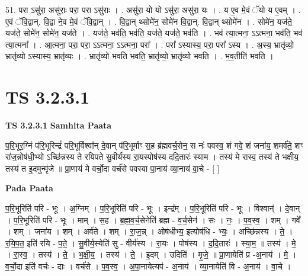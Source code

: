 \documentclass[17pt]{extarticle}
\begin{document}
51. परा ऽसु॑रा॒ असु॑राः॒ परा॒ परा ऽसु॑राः । . असु॑रा॒ यो यो ऽसु॑रा॒ असु॑रा॒ यः । . य ए॒व मे॒वं ॅयो य ए॒वम् । . ए॒वं ॅवि॒द्वान्. वि॒द्वा ने॒व मे॒वं ॅवि॒द्वान् । . वि॒द्वान् थ्सोमे॑न॒ सोमे॑न वि॒द्वान्. वि॒द्वान् थ्सोमे॑न । . सोमे॑न॒ यज॑ते॒ यज॑ते॒ सोमे॑न॒ सोमे॑न॒ यज॑ते । . यज॑ते॒ भव॑ति॒ भव॑ति॒ यज॑ते॒ यज॑ते॒ भव॑ति । . भव॑ त्या॒त्मना॒ ऽऽत्मना॒ भव॑ति॒ भव॑ त्या॒त्मना᳚ । . आ॒त्मना॒ परा॒ परा॒ ऽऽत्मना॒ ऽऽत्मना॒ परा᳚ । . परा᳚ ऽस्यास्य॒ परा॒ परा᳚ ऽस्य । . अ॒स्य॒ भ्रातृ॑व्यो॒ भ्रातृ॑व्यो ऽस्यास्य॒ भ्रातृ॑व्यः । . भ्रातृ॑व्यो भवति भवति॒ भ्रातृ॑व्यो॒ भ्रातृ॑व्यो भवति । . भ॒व॒तीति॑ भवति । \newline


\section{ TS 3.2.3.1 }

\textbf{TS 3.2.3.1 } \newline
\textbf{Samhita Paata} \newline

प॒रि॒भूर॒ग्निं प॑रि॒भूरिन्द्रं॑ परि॒भूर्विश्वा᳚न् दे॒वान् प॑रि॒भूर्माꣳ स॒ह ब्र॑ह्मवर्च॒सेन॒ स नः॑ पवस्व॒ शं गवे॒ शं जना॑य॒ शमर्व॑ते॒ शꣳ रा॑ज॒न्नोष॑धी॒भ्यो ऽच्छि॑न्नस्य ते रयिपते सु॒वीर्य॑स्य रा॒यस्पोष॑स्य ददि॒तारः॑ स्याम । तस्य॑ मे रास्व॒ तस्य॑ ते भक्षीय॒ तस्य॑ त इ॒दमुन्मृ॑जे ॥ प्रा॒णाय॑ मे वर्चो॒दा वर्च॑से पवस्वा पा॒नाय॑ व्या॒नाय॑ वा॒चे - [  ] \newline

\textbf{Pada Paata} \newline

प॒रि॒भूरिति॑ परि - भूः । अ॒ग्निम् । प॒रि॒भूरिति॑ परि - भूः । इन्द्र᳚म् । प॒रि॒भूरिति॑ परि - भूः । विश्वान्॑ । दे॒वान् । प॒रि॒भूरिति॑ परि - भूः । माम् । स॒ह । ब्र॒ह्म॒व॒र्च॒सेनेति॑ ब्रह्म - व॒र्च॒सेन॑ । सः । नः॒ । प॒व॒स्व॒ । शम् । गवे᳚ । शम् । जना॑य । शम् । अर्व॑ते । शम् । रा॒ज॒न्न् । ओष॑धीभ्य॒ इत्योष॑धि - भ्यः॒ । अच्छि॑न्नस्य । ते॒ । र॒यि॒प॒त॒ इति॑ रयि - प॒ते॒ । सु॒वीर्य॒स्येति॑ सु - वीर्य॑स्य । रा॒यः । पोष॑स्य । द॒दि॒तारः॑ । स्या॒म॒ ॥ तस्य॑ । मे॒ । रा॒स्व॒ । तस्य॑ । ते॒ । भ॒क्षी॒य॒ । तस्य॑ । ते॒ । इ॒दम् । उदिति॑ । मृ॒जे॒ ॥ प्रा॒णायेति॑ प्र -अ॒नाय॑ । मे॒ । व॒र्चो॒दा इति॑ वर्चः - दाः । वर्च॑से । प॒व॒स्व॒ । अ॒पा॒नायेत्यप॑ - अ॒नाय॑ । व्या॒नायेति॑ वि - अ॒नाय॑ । वा॒चे ।  \newline
\end{document}
